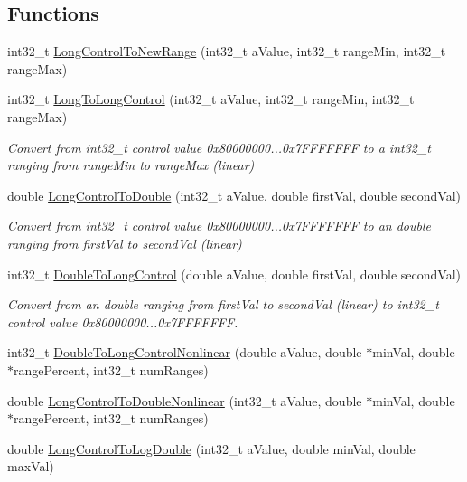 \subsection*{Functions}
\begin{DoxyCompactItemize}
\item 
int32\+\_\+t \hyperlink{a00295_a5125f531cd70d1d4049c99335989a0ee}{Long\+Control\+To\+New\+Range} (int32\+\_\+t a\+Value, int32\+\_\+t range\+Min, int32\+\_\+t range\+Max)
\item 
int32\+\_\+t \hyperlink{a00295_abb594c44cd5d4dee1ec236f7c69adacb}{Long\+To\+Long\+Control} (int32\+\_\+t a\+Value, int32\+\_\+t range\+Min, int32\+\_\+t range\+Max)
\begin{DoxyCompactList}\small\item\em Convert from int32\+\_\+t control value 0x80000000...0x7\+F\+F\+F\+F\+F\+F\+F to a int32\+\_\+t ranging from range\+Min to range\+Max (linear) \end{DoxyCompactList}\item 
double \hyperlink{a00295_a8c8994b0486ed20075fd7808dc0bc01e}{Long\+Control\+To\+Double} (int32\+\_\+t a\+Value, double first\+Val, double second\+Val)
\begin{DoxyCompactList}\small\item\em Convert from int32\+\_\+t control value 0x80000000...0x7\+F\+F\+F\+F\+F\+F\+F to an double ranging from first\+Val to second\+Val (linear) \end{DoxyCompactList}\item 
int32\+\_\+t \hyperlink{a00295_a285ce2bf578a7ceb8c12eabbd5e5ad37}{Double\+To\+Long\+Control} (double a\+Value, double first\+Val, double second\+Val)
\begin{DoxyCompactList}\small\item\em Convert from an double ranging from first\+Val to second\+Val (linear) to int32\+\_\+t control value 0x80000000...0x7\+F\+F\+F\+F\+F\+F\+F. \end{DoxyCompactList}\item 
int32\+\_\+t \hyperlink{a00295_a76082aa640489b279cd7683c12fcbd33}{Double\+To\+Long\+Control\+Nonlinear} (double a\+Value, double $\ast$min\+Val, double $\ast$range\+Percent, int32\+\_\+t num\+Ranges)
\item 
double \hyperlink{a00295_a81279cd99c7d7193e4f79d5c74dccf54}{Long\+Control\+To\+Double\+Nonlinear} (int32\+\_\+t a\+Value, double $\ast$min\+Val, double $\ast$range\+Percent, int32\+\_\+t num\+Ranges)
\item 
double \hyperlink{a00295_ae8dc426096379e56390b687762c79665}{Long\+Control\+To\+Log\+Double} (int32\+\_\+t a\+Value, double min\+Val, double max\+Val)

\end{DoxyCompactItemize}
